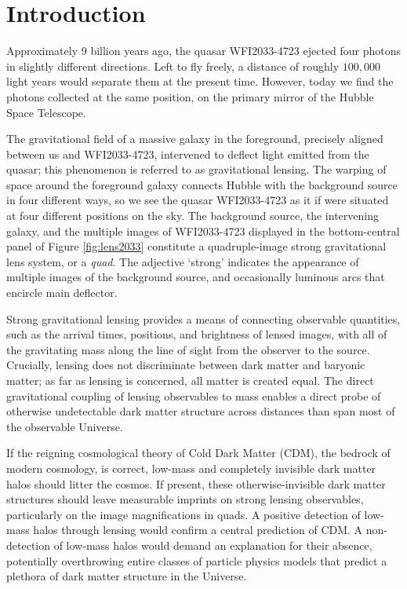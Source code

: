 
%
%

\chapter{Introduction}

\indent Approximately 9 billion years ago, the quasar WFI2033-4723 ejected four photons in slightly different directions. Left to fly freely, a distance of roughly $100,000$ light years would separate them at the present time. However, today we find the photons collected at the same position, on the primary mirror of the Hubble Space Telescope. 

The gravitational field of a massive galaxy in the foreground, precisely aligned between us and WFI2033-4723, intervened to deflect light emitted from the quasar; this phenomenon is referred to as gravitational lensing. The warping of space around the foreground galaxy connects Hubble with the background source in four different ways, so we see the quasar WFI2033-4723 as it if were situated at four different positions on the sky. The background source, the intervening galaxy, and the multiple images of WFI2033-4723 displayed in the bottom-central panel of Figure \ref{fig:lens2033} constitute a quadruple-image strong gravitational lens system, or a \textit{quad}. The adjective `strong' indicates the appearance of multiple images of the background source, and occasionally luminous arcs that encircle main deflector. 

Strong gravitational lensing provides a means of connecting observable quantities, such as the arrival times, positions, and brightness of lensed images, with all of the gravitating mass along the line of sight from the observer to the source. Crucially, lensing does not discriminate between dark matter and baryonic matter; as far as lensing is concerned, all matter is created equal. The direct gravitational coupling of lensing observables to mass enables a direct probe of otherwise undetectable dark matter structure across distances than span most of the observable Universe.    

If the reigning cosmological theory of Cold Dark Matter (CDM), the bedrock of modern cosmology, is correct, low-mass and completely invisible dark matter halos should litter the cosmos. If present, these otherwise-invisible dark matter structures should leave measurable imprints on strong lensing observables, particularly on the image magnifications in quads. A positive detection of low-mass halos through lensing would confirm a central prediction of CDM. A non-detection of low-mass halos would demand an explanation for their absence, potentially overthrowing entire classes of particle physics models that predict a plethora of dark matter structure in the Universe. 

